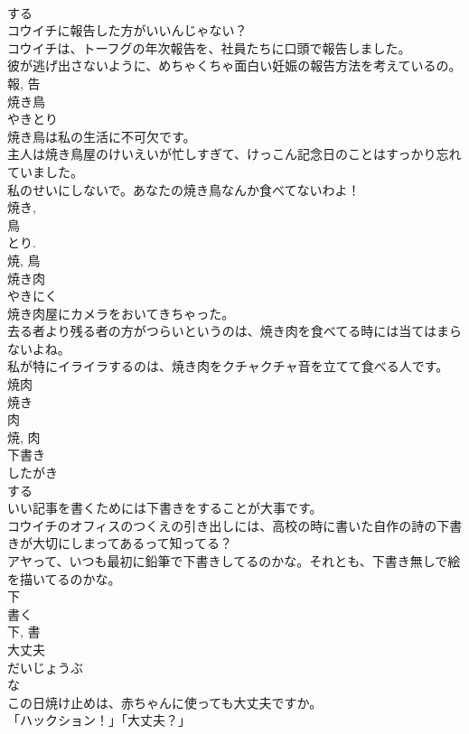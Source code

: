 \documentclass[8pt]{extreport}
\begin{document}
\begin{CJK}{UTF8}{min}
\\	する 
\\	コウイチに報告した方がいいんじゃない？	
\\	コウイチは、トーフグの年次報告を、社員たちに口頭で報告しました。	
\\	彼が逃げ出さないように、めちゃくちゃ面白い妊娠の報告方法を考えているの。	
\\	報, 告	
\\	焼き鳥	
\\	やきとり	
\\	焼き鳥は私の生活に不可欠です。	
\\	主人は焼き鳥屋のけいえいが忙しすぎて、けっこん記念日のことはすっかり忘れていました。	
\\	私のせいにしないで。あなたの焼き鳥なんか食べてないわよ！	
\\	焼き, 
\\	鳥 
\\	とり. 
\\	焼, 鳥	
\\	焼き肉	
\\	やきにく	
\\	焼き肉屋にカメラをおいてきちゃった。	
\\	去る者より残る者の方がつらいというのは、焼き肉を食べてる時には当てはまらないよね。	
\\	私が特にイライラするのは、焼き肉をクチャクチャ音を立てて食べる人です。	
\\	焼肉 
\\	焼き 
\\	肉 
\\	焼, 肉	
\\	下書き	
\\	したがき	
\\	する 
\\	いい記事を書くためには下書きをすることが大事です。	
\\	コウイチのオフィスのつくえの引き出しには、高校の時に書いた自作の詩の下書きが大切にしまってあるって知ってる？	
\\	アヤって、いつも最初に鉛筆で下書きしてるのかな。それとも、下書き無しで絵を描いてるのかな。	
\\	下 
\\	書く 
\\	下, 書	
\\	大丈夫	
\\	だいじょうぶ	
\\	な 
\\	この日焼け止めは、赤ちゃんに使っても大丈夫ですか。	
\\	「ハックション！」「大丈夫？」	

\end{CJK}
\end{document}
